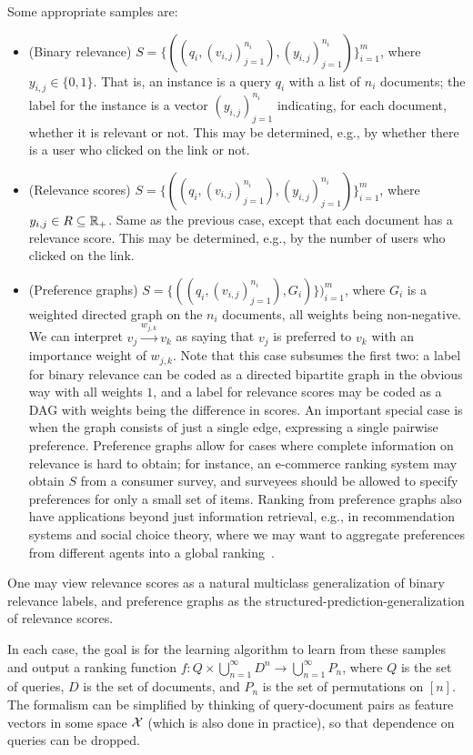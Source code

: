 Some appropriate samples are:
\begin{itemize}
\item (Binary relevance)
  $S = \{ ((q_i, (v_{i, j})_{j=1}^{n_i}), (y_{i, j})_{j=1}^{n_i}) \}_{i=1}^m$, where
  $y_{i,j} \in \{0, 1\}$.
  That is, an instance is a query $q_i$ with a list of $n_i$ documents;
  the label for the instance is a vector $(y_{i, j})_{j=1}^{n_i}$ indicating,
  for each document, whether it is relevant or not.
  This may be determined, e.g., by whether there is a
  user who clicked on the link or not.
\item (Relevance scores)
  $S = \{ ( (q_i, (v_{i, j})_{j=1}^{n_i}), (y_{i, j})_{j=1}^{n_i}) \}_{i=1}^m$,
  where $y_{i,j} \in R \subseteq {\mathbb R}_+$.
  Same as the previous case, except that each document has a relevance
  score. 
  This may be determined, e.g., by the number of users who clicked on the link.
\item (Preference graphs) 
  $S = \{((q_i, (v_{i,j})_{j=1}^{n_i}), G_i)\})_{i=1}^m$, where $G_i$ is a weighted
  directed graph on the $n_i$ documents, all weights being non-negative.
  We can interpret $v_j \overset{w_{j,k}}{\to} v_k$ as saying that $v_j$ is
  preferred to $v_k$ with an importance weight of $w_{j,k}$.
  Note that this case subsumes the first two: a label for binary relevance
  can be coded as a directed bipartite graph in the obvious way
  with all weights $1$, and a label for relevance scores may be coded as a
  DAG with weights being the difference in scores.
  An important special case is when the graph consists
  of just a single edge, expressing a single pairwise preference.
  Preference graphs allow for cases where complete information on relevance is
  hard to obtain; for instance, an e-commerce ranking system may obtain $S$
  from a consumer survey, and surveyees should be allowed to specify
  preferences for only a small set of items. Ranking from preference graphs
  also have applications beyond just information retrieval, e.g., in
  recommendation systems and social choice theory, where we may want to
  aggregate preferences from different agents into a global ranking~\cite{}.
\end{itemize}
One may view relevance scores as a natural multiclass generalization of binary
relevance labels, and preference graphs as the
structured-prediction-generalization of relevance scores.

In each case, the goal is for the learning algorithm to learn from these samples
and output a ranking function
$f: Q \times \bigcup_{n=1}^\infty D^n \to \bigcup_{n=1}^\infty P_n$, where $Q$
is the set of queries, $D$ is the set of documents,
and $P_n$ is the set of permutations on $[n]$.
The formalism can be simplified by thinking of query-document pairs as feature
vectors in some space ${\mathcal X}$ (which is also done in practice), so
that dependence on queries can be dropped.

